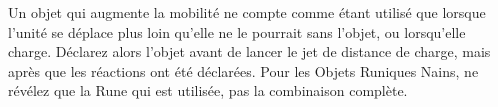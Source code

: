 Un objet qui augmente la mobilité ne compte comme étant utilisé que lorsque l'unité se déplace plus loin qu'elle ne le pourrait sans l'objet, ou lorsqu'elle charge. Déclarez alors l'objet avant de lancer le jet de distance de charge, mais après que les réactions ont été déclarées. Pour les Objets Runiques Nains, ne révélez que la Rune qui est utilisée, pas la combinaison complète.

